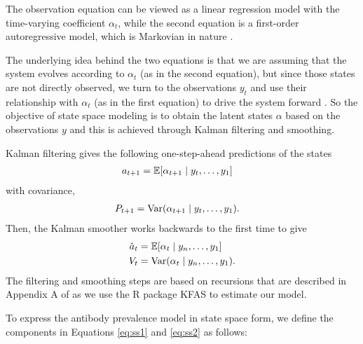 The observation equation can be viewed as a linear regression model with the
time-varying coefficient $\alpha_t$, while the second equation is a first-order
autoregressive model, which is Markovian in nature \citep{durbin2012time}. 

The underlying idea behind the two equations is that we are assuming that the
system evolves according to $\alpha_t$ (as in the second equation), but since
those states are not directly observed, we turn to the observations $y_t$ and
use their relationship with $\alpha_t$ (as in the first equation) to drive the
system forward \citep{durbin2012time}. So the objective of state space modeling
is to obtain the latent states $\alpha$ based on the observations $y$ and this
is achieved through Kalman filtering and smoothing. 

Kalman filtering gives the following one-step-ahead predictions of the states
\begin{align*}
a_{t+1} &= \mathbb{E}[\alpha_{t+1}\mid y_t, \dots, y_1] 
\end{align*} with covariance,
\begin{align*}
P_{t+1} &= \operatorname{Var}(\alpha_{t+1} \mid y_t, \dots, y_1).
\end{align*}
Then, the Kalman smoother works backwards to the first time to give
\begin{align}
\hat{a}_t &= \mathbb{E}[\alpha_{t}\mid y_n, \dots, y_1] \label{eq:hatat}\\
V_t &= \operatorname{Var}(\alpha_{t}\mid y_n, \dots, y_1). \label{eq:Vt}
\end{align}
The filtering and smoothing steps are based on recursions that are described in
Appendix A of \citep{helske2017kfas} as we use the R package KFAS to estimate
our model.


To express the antibody prevalence model in state space form, we define
 the components in Equations \ref{eq:ss1} and \ref{eq:ss2} as follows:


